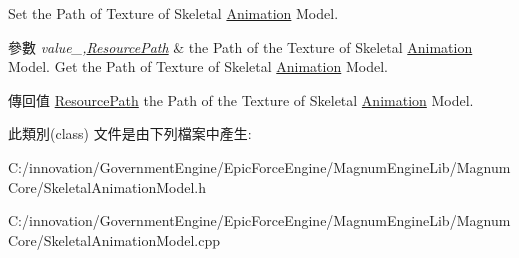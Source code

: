 Set the Path of Texture of Skeletal \hyperlink{class_i_dream_sky_1_1_skeletal_animation_model_1_1_animation}{Animation} Model. 


\begin{DoxyParams}{參數}
{\em value\+\_\+,\hyperlink{class_i_dream_sky_1_1_resource_path}{Resource\+Path}} & the Path of the Texture of Skeletal \hyperlink{class_i_dream_sky_1_1_skeletal_animation_model_1_1_animation}{Animation} Model. Get the Path of Texture of Skeletal \hyperlink{class_i_dream_sky_1_1_skeletal_animation_model_1_1_animation}{Animation} Model. \\
\hline
\end{DoxyParams}
\begin{DoxyReturn}{傳回值}
\hyperlink{class_i_dream_sky_1_1_resource_path}{Resource\+Path} the Path of the Texture of Skeletal \hyperlink{class_i_dream_sky_1_1_skeletal_animation_model_1_1_animation}{Animation} Model. 
\end{DoxyReturn}


此類別(class) 文件是由下列檔案中產生\+:\begin{DoxyCompactItemize}
\item 
C\+:/innovation/\+Government\+Engine/\+Epic\+Force\+Engine/\+Magnum\+Engine\+Lib/\+Magnum\+Core/Skeletal\+Animation\+Model.\+h\item 
C\+:/innovation/\+Government\+Engine/\+Epic\+Force\+Engine/\+Magnum\+Engine\+Lib/\+Magnum\+Core/Skeletal\+Animation\+Model.\+cpp\end{DoxyCompactItemize}
